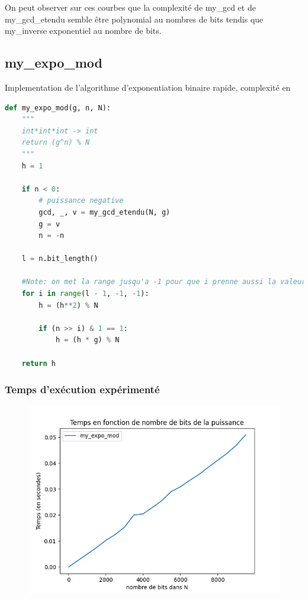\documentclass{article}
\begin{document}
On peut observer sur ces courbes que la complexité de my\_gcd et de my\_gcd\_etendu semble être polynomial au nombres de bits tendis que my\_inverse exponentiel au nombre de bits. 

\subsection{my\_expo\_mod}

Implementation de l'algorithme d'exponentiation binaire rapide, complexité en
\begin{lstlisting}[language=Python, caption=my\_expo\_mod]
def my_expo_mod(g, n, N):
    """
    int*int*int -> int
    return (g^n) % N
    """
    h = 1

    if n < 0:
        # puissance negative
        gcd, _, v = my_gcd_etendu(N, g)
        g = v
        n = -n
        
    l = n.bit_length()

    #Note: on met la range jusqu'a -1 pour que i prenne aussi la valeur 0.
    for i in range(l - 1, -1, -1):
        h = (h**2) % N

        if (n >> i) & 1 == 1:
            h = (h * g) % N

    return h
\end{lstlisting}

\subsubsection{Temps d'exécution expérimenté}

\begin{figure}[H]
    \centering
    \includegraphics[width=0.7\linewidth]{Temps en fonction de nombre de bits de la puissance.png}
    \caption{}
    \label{fig:exp_mod}
\end{figure}
\end{document}
